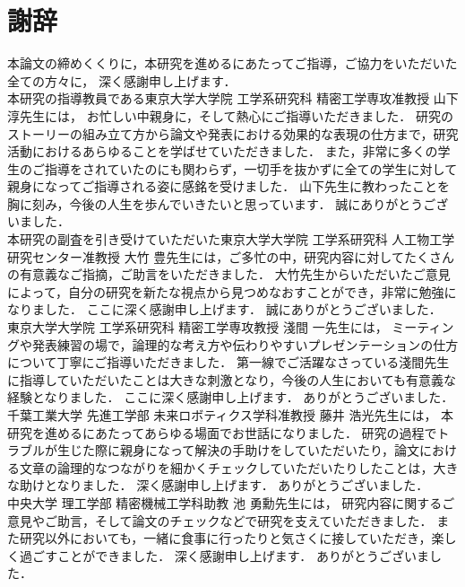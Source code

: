 \chapter*{謝辞}
\thispagestyle{empty}
\label{thankyou}

\newpage

本論文の締めくくりに，本研究を進めるにあたってご指導，ご協力をいただいた全ての方々に，
深く感謝申し上げます．
\\

本研究の指導教員である東京大学大学院 工学系研究科 精密工学専攻准教授 山下 淳先生には，
お忙しい中親身に，そして熱心にご指導いただきました．
研究のストーリーの組み立て方から論文や発表における効果的な表現の仕方まで，研究活動におけるあらゆることを学ばせていただきました．
また，非常に多くの学生のご指導をされていたのにも関わらず，一切手を抜かずに全ての学生に対して親身になってご指導される姿に感銘を受けました．
山下先生に教わったことを胸に刻み，今後の人生を歩んでいきたいと思っています．
誠にありがとうございました．
\\

本研究の副査を引き受けていただいた東京大学大学院 工学系研究科 人工物工学研究センター准教授 大竹 豊先生には，ご多忙の中，研究内容に対してたくさんの有意義なご指摘，ご助言をいただきました．
大竹先生からいただいたご意見によって，自分の研究を新たな視点から見つめなおすことができ，非常に勉強になりました．
ここに深く感謝申し上げます．
誠にありがとうございました．
\\

東京大学大学院 工学系研究科 精密工学専攻教授 淺間 一先生には，
ミーティングや発表練習の場で，論理的な考え方や伝わりやすいプレゼンテーションの仕方について丁寧にご指導いただきました．
第一線でご活躍なさっている淺間先生に指導していただいたことは大きな刺激となり，今後の人生においても有意義な経験となりました．
ここに深く感謝申し上げます．
ありがとうございました．
\\

千葉工業大学 先進工学部 未来ロボティクス学科准教授 藤井 浩光先生には，
本研究を進めるにあたってあらゆる場面でお世話になりました．
研究の過程でトラブルが生じた際に親身になって解決の手助けをしていただいたり，論文における文章の論理的なつながりを細かくチェックしていただいたりしたことは，大きな助けとなりました．
深く感謝申し上げます．
ありがとうございました．
\\

中央大学 理工学部 精密機械工学科助教 池 勇勳先生には，
研究内容に関するご意見やご助言，そして論文のチェックなどで研究を支えていただきました．
また研究以外においても，一緒に食事に行ったりと気さくに接していただき，楽しく過ごすことができました．
深く感謝申し上げます．
ありがとうございました．
\\

